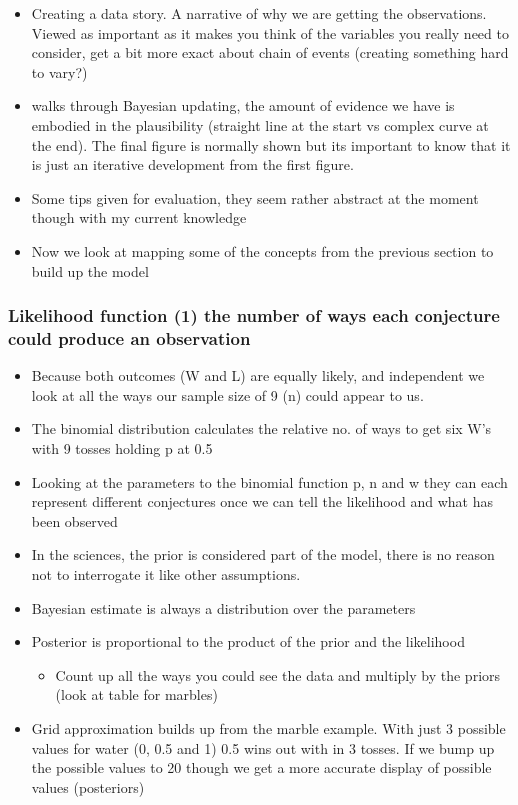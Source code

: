 \documentclass[11pt]{article}
\begin{document}
\begin{itemize}
\tightlist
\item
  Creating a data story. A narrative of why we are getting the
  observations. Viewed as important as it makes you think of the
  variables you really need to consider, get a bit more exact about
  chain of events (creating something hard to vary?)
\item
  walks through Bayesian updating, the amount of evidence we have is
  embodied in the plausibility (straight line at the start vs complex
  curve at the end). The final figure is normally shown but its
  important to know that it is just an iterative development from the
  first figure.
\item
  Some tips given for evaluation, they seem rather abstract at the
  moment though with my current knowledge
\item
  Now we look at mapping some of the concepts from the previous section
  to build up the model
\end{itemize}

\hypertarget{likelihood-function-1-the-number-of-ways-each-conjecture-could-produce-an-observation}{%
\subsubsection{Likelihood function (1) the number of ways each
conjecture could produce an
observation}\label{likelihood-function-1-the-number-of-ways-each-conjecture-could-produce-an-observation}}

\begin{itemize}
\tightlist
\item
  Because both outcomes (W and L) are equally likely, and independent we
  look at all the ways our sample size of 9 (n) could appear to us.
\item
  The binomial distribution calculates the relative no. of ways to get
  six W's with 9 tosses holding p at 0.5
\item
  Looking at the parameters to the binomial function p, n and w they can
  each represent different conjectures once we can tell the likelihood
  and what has been observed
\item
  In the sciences, the prior is considered part of the model, there is
  no reason not to interrogate it like other assumptions.
\item
  Bayesian estimate is always a distribution over the parameters
\item
  Posterior is proportional to the product of the prior and the
  likelihood

  \begin{itemize}
  \tightlist
  \item
    Count up all the ways you could see the data and multiply by the
    priors (look at table for marbles)
  \end{itemize}
\item
  Grid approximation builds up from the marble example. With just 3
  possible values for water (0, 0.5 and 1) 0.5 wins out with in 3
  tosses. If we bump up the possible values to 20 though we get a more
  accurate display of possible values (posteriors)
\end{itemize}
\end{document}
